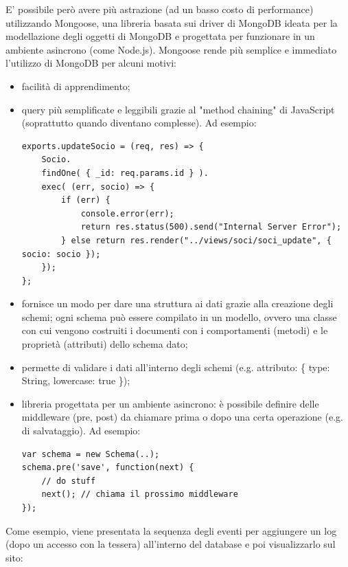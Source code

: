 \documentclass[12pt]{report}
\begin{document}
E' possibile però avere più astrazione (ad un basso costo di performance) utilizzando Mongoose, una libreria basata sui driver di MongoDB ideata per la modellazione degli oggetti di MongoDB e progettata per funzionare in un ambiente asincrono (come Node.js). Mongoose rende più semplice e immediato l'utilizzo di MongoDB per alcuni motivi:
\begin{itemize}
	\item facilità di apprendimento;
	\item query più semplificate e leggibili grazie al "method chaining" di JavaScript (soprattutto quando diventano complesse). Ad esempio:
\begin{lstlisting}
exports.updateSocio = (req, res) => {
	Socio.
	findOne( { _id: req.params.id } ).
	exec( (err, socio) => {
		if (err) {
			console.error(err);
			return res.status(500).send("Internal Server Error");
		} else return res.render("../views/soci/soci_update", { socio: socio });
	});
};
\end{lstlisting}
	\item fornisce un modo per dare una struttura ai dati grazie alla creazione degli schemi; ogni schema può essere compilato in un modello, ovvero una classe con cui vengono costruiti i documenti con i comportamenti (metodi) e le proprietà (attributi) dello schema dato;
	\item permette di validare i dati all'interno degli schemi (e.g. attributo: \{ type: String, lowercase: true \});
	\item libreria progettata per un ambiente asincrono: è possibile definire delle middleware (pre, post) da chiamare prima o dopo una certa operazione (e.g. di salvataggio). Ad esempio:
\begin{lstlisting}
var schema = new Schema(..);
schema.pre('save', function(next) {
	// do stuff
	next(); // chiama il prossimo middleware
});
\end{lstlisting}
\end{itemize}
Come esempio, viene presentata la sequenza degli eventi per aggiungere un log (dopo un accesso con la tessera) all'interno del database e poi visualizzarlo sul sito:
\end{document}
